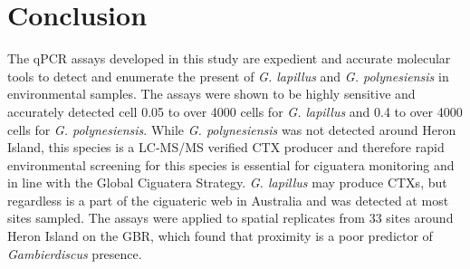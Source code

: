 \documentclass[12pt]{article}
\begin{document}
\section*{Conclusion}
The qPCR assays developed in this study are expedient and accurate molecular tools to detect and enumerate the present of \emph{G. lapillus} and \emph{G. polynesiensis} in environmental samples. The assays were shown to be highly sensitive and accurately detected cell 0.05 to over 4000 cells for \emph{G. lapillus} and 0.4 to over 4000 cells for \emph{G. polynesiensis}.
While \emph{G. polynesiensis} was not detected around Heron Island, this species is a LC-MS/MS verified CTX producer and therefore rapid environmental screening for this species is essential for ciguatera monitoring and in line with the Global Ciguatera Strategy. \emph{G. lapillus} may produce CTXs, but regardless is a part of the ciguateric web in Australia and was detected at most sites sampled.
The assays were applied to spatial replicates from 33 sites around Heron Island on the GBR, which found that proximity is a poor predictor of \textit{Gambierdiscus} presence.
\end{document}
